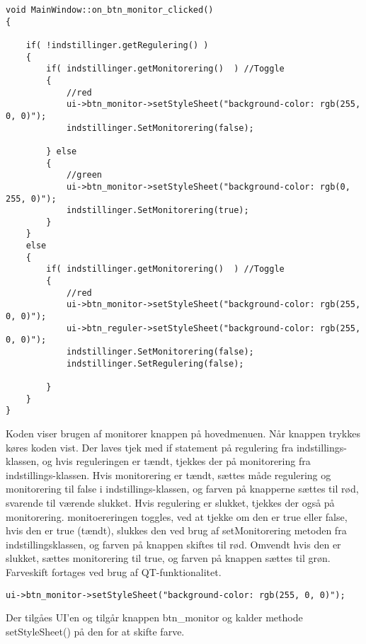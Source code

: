 \clearpage %
\begin{lstlisting}
void MainWindow::on_btn_monitor_clicked()
{

    if( !indstillinger.getRegulering() )
    {
        if( indstillinger.getMonitorering()  ) //Toggle
        {
            //red
            ui->btn_monitor->setStyleSheet("background-color: rgb(255, 0, 0)");
            indstillinger.SetMonitorering(false);

        } else
        {
            //green
            ui->btn_monitor->setStyleSheet("background-color: rgb(0, 255, 0)");
            indstillinger.SetMonitorering(true);
        }
    }
    else
    {
        if( indstillinger.getMonitorering()  ) //Toggle
        {
            //red
            ui->btn_monitor->setStyleSheet("background-color: rgb(255, 0, 0)");
            ui->btn_reguler->setStyleSheet("background-color: rgb(255, 0, 0)");
            indstillinger.SetMonitorering(false);
            indstillinger.SetRegulering(false);

        }
    }
}

\end{lstlisting}

Koden viser brugen af monitorer knappen på hovedmenuen. Når knappen trykkes køres koden vist.
Der laves tjek med if statement på regulering fra indstillings-klassen, og hvis reguleringen er tændt, tjekkes der på monitorering fra indstillings-klassen. Hvis monitorering er tændt, sættes måde regulering og monitorering til false i indstillings-klassen, og farven på knapperne sættes til rød, svarende til værende slukket. Hvis regulering er slukket, tjekkes der også på monitorering. monitoereringen toggles, ved at tjekke om den er true eller false, hvis den er true (tændt), slukkes den ved brug af setMonitorering metoden fra indstillingsklassen, og farven på knappen skiftes til rød. Omvendt hvis den er slukket, sættes monitorering til true, og farven på knappen sættes til grøn. 
Farveskift fortages ved brug af QT-funktionalitet.
\begin{lstlisting}
ui->btn_monitor->setStyleSheet("background-color: rgb(255, 0, 0)");
\end{lstlisting}
Der tilgåes UI'en og tilgår knappen btn\_monitor og kalder methode setStyleSheet() på den for at skifte farve.

\clearpage

